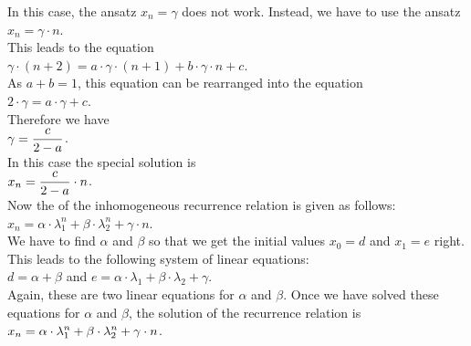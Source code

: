 \begin{enumerate}
\begin{enumerate}
            In this case, the ansatz $x_n = \gamma$ does not work.  Instead, we have to use the ansatz
            \\[0.2cm]
            \hspace*{1.3cm}
            $x_n = \gamma \cdot n$.           
            \\[0.2cm]
            This leads to the equation
            \\[0.2cm]
            \hspace*{1.3cm}
            $\gamma \cdot (n+2) = a \cdot \gamma \cdot (n+1) + b \cdot \gamma \cdot n + c$.
            \\[0.2cm]
            As $a + b = 1$, this equation can be rearranged into the equation
            \\[0.2cm]
            \hspace*{1.3cm}
            $2 \cdot \gamma = a \cdot \gamma + c$.
            \\[0.2cm]
            Therefore we have 
            \\[0.2cm]
            \hspace*{1.3cm}
            $\displaystyle \gamma = \frac{c}{2 - a}$.
            \\[0.2cm]
            In this case the special solution is
            \\[0.2cm]
            \hspace*{1.3cm}
            $\displaystyle x_n = \frac{c}{2 - a} \cdot n$.
            \\[0.2cm]
            Now the  of the inhomogeneous recurrence relation is given as follows:
            \\[0.2cm]
            \hspace*{1.3cm}
            $x_n = \alpha \cdot \lambda_1^n + \beta \cdot \lambda_2^n + \gamma \cdot n$.
            \\[0.2cm]
            We have to find $\alpha$ and $\beta$ so that we get the initial values $x_0 = d$ and $x_1 = e$ right.
            This leads to the following system of linear equations:
            \\[0.2cm]
            \hspace*{1.3cm}
            $d = \alpha + \beta$ \quad and \quad $e = \alpha \cdot \lambda_1 + \beta \cdot \lambda_2 + \gamma$.
            \\[0.2cm]
            Again, these are two linear equations for $\alpha$ and $\beta$.  Once we have solved these equations for $\alpha$ and
            $\beta$, the solution of the recurrence relation is
            \\[0.2cm]
            \hspace*{1.3cm}
            $\displaystyle x_{n} = \alpha \cdot \lambda_1^n + \beta \cdot \lambda_2^n + \gamma \cdot n$.
      \end{enumerate}
\end{enumerate}
